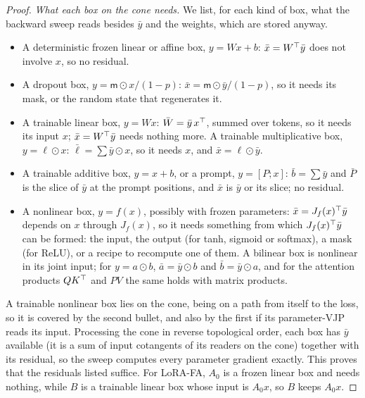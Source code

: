 \begin{proof}
\emph{What each box on the cone needs.} We list, for each kind of box, what the backward sweep reads besides $\bar y$ and
the weights, which are stored anyway.
\begin{itemize}
  \item A deterministic frozen linear or affine box, $y=Wx+b$: $\bar x=W^{\top}\bar y$ does not involve $x$, so no residual.
  \item A dropout box, $y=\mathsf m\odot x/(1-p)$: $\bar x=\mathsf m\odot\bar y/(1-p)$, so it needs its mask, or the random
  state that regenerates it.
  \item A trainable linear box, $y=Wx$: $\bar W=\bar y\,x^{\top}$, summed over tokens, so it needs its input $x$; $\bar x=W^{\top}\bar
  y$ needs nothing more. A trainable multiplicative box, $y=\ell\odot x$: $\bar\ell=\sum\bar y\odot x$, so it needs $x$,
  and $\bar x=\ell\odot\bar y$.
  \item A trainable additive box, $y=x+b$, or a prompt, $y=[P;x]$: $\bar b=\sum\bar y$ and $\bar P$ is the slice of $\bar y$
  at the prompt positions, and $\bar x$ is $\bar y$ or its slice; no residual.
  \item A nonlinear box, $y=f(x)$, possibly with frozen parameters: $\bar x=J_f(x)^{\top}\bar y$ depends on $x$ through
  $J_f(x)$, so it needs something from which $J_f(x)^{\top}\bar y$ can be formed: the input, the output (for tanh, sigmoid or
  softmax), a mask (for ReLU), or a recipe to recompute one of them. A bilinear box is nonlinear in its joint input; for
  $y=a\odot b$, $\bar a=\bar y\odot b$ and $\bar b=\bar y\odot a$, and for the attention products $QK^{\top}$ and $PV$ the same
  holds with matrix products.
\end{itemize}
A trainable nonlinear box lies on the cone, being on a path from itself to the loss, so it is covered by the second bullet,
and also by the first if its parameter-VJP reads its input. Processing the cone in reverse topological order, each box has
$\bar y$ available (it is a sum of input cotangents of its readers on the cone) together with its residual, so the sweep
computes every parameter gradient exactly. This proves that the residuals listed suffice. For LoRA-FA, $A_0$ is a frozen
linear box and needs nothing, while $B$ is a trainable linear box whose input is $A_0x$, so $B$ keeps $A_0x$.


\end{proof}
